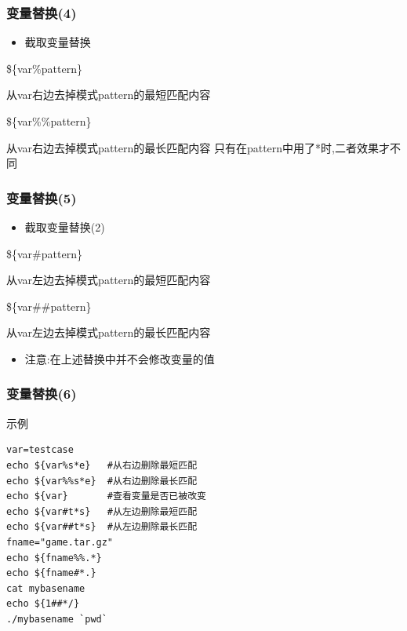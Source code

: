 \documentclass[xcolor=svgnames,presentation]{beamer}
\begin{document}
\begin{frame}
\frametitle{变量替换(4)}
\label{sec-1-2-13}
\begin{itemize}

\item 截取变量替换
\label{sec-1-2-13-1}%
\end{itemize} %
\begin{exampleblock}{\$\{var\%pattern\}}
\label{sec-1-2-13-2}

从var右边去掉模式pattern的最短匹配内容
\end{exampleblock}
\begin{block}{\$\{var\%\%pattern\}}
\label{sec-1-2-13-3}

从var右边去掉模式pattern的最长匹配内容
只有在pattern中用了*时,二者效果才不同
\end{block}
\end{frame}
\begin{frame}
\frametitle{变量替换(5)}
\label{sec-1-2-14}
\begin{itemize}

\item 截取变量替换(2)
\label{sec-1-2-14-1}%
\end{itemize} %
\begin{exampleblock}{\$\{var\#pattern\}}
\label{sec-1-2-14-2}

从var左边去掉模式pattern的最短匹配内容
\end{exampleblock}
\begin{block}{\$\{var\#\#pattern\}}
\label{sec-1-2-14-3}

从var左边去掉模式pattern的最长匹配内容
\end{block}
\begin{itemize}

\item 注意:在上述替换中并不会修改变量的值
\label{sec-1-2-14-4}%
\end{itemize} %
\end{frame}
\begin{frame}[fragile]
\frametitle{变量替换(6)}
\label{sec-1-2-15}
\begin{exampleblock}{示例}
\label{sec-1-2-15-1}


\begin{verbatim}
var=testcase
echo ${var%s*e}   #从右边删除最短匹配
echo ${var%%s*e}  #从右边删除最长匹配
echo ${var}       #查看变量是否已被改变
echo ${var#t*s}   #从左边删除最短匹配
echo ${var##t*s}  #从左边删除最长匹配
fname="game.tar.gz"
echo ${fname%%.*}
echo ${fname#*.}
cat mybasename
echo ${1##*/}
./mybasename `pwd`
\end{verbatim}
\end{exampleblock}
\end{frame}
\end{document}

